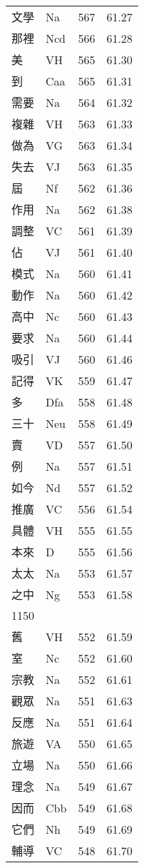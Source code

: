 \documentclass[twocolumn]{book}
\begin{document}
\begin{supertabular}{llrr}
文學 & Na & 567 &  61.27\\
那裡 & Ncd & 566 &  61.28\\
美 & VH & 565 &  61.30\\
到 & Caa & 565 &  61.31\\
需要 & Na & 564 &  61.32\\
複雜 & VH & 563 &  61.33\\
做為 & VG & 563 &  61.34\\
失去 & VJ & 563 &  61.35\\
屆 & Nf & 562 &  61.36\\
作用 & Na & 562 &  61.38\\
調整 & VC & 561 &  61.39\\
佔 & VJ & 561 &  61.40\\
模式 & Na & 560 &  61.41\\
動作 & Na & 560 &  61.42\\
高中 & Nc & 560 &  61.43\\
要求 & Na & 560 &  61.44\\
吸引 & VJ & 560 &  61.46\\
記得 & VK & 559 &  61.47\\
多 & Dfa & 558 &  61.48\\
三十 & Neu & 558 &  61.49\\
賣 & VD & 557 &  61.50\\
例 & Na & 557 &  61.51\\
如今 & Nd & 557 &  61.52\\
推廣 & VC & 556 &  61.54\\
具體 & VH & 555 &  61.55\\
本來 & D & 555 &  61.56\\
太太 & Na & 553 &  61.57\\
之中 & Ng & 553 &  61.58\\
1150\\
舊 & VH & 552 &  61.59\\
室 & Nc & 552 &  61.60\\
宗教 & Na & 552 &  61.61\\
觀眾 & Na & 551 &  61.63\\
反應 & Na & 551 &  61.64\\
旅遊 & VA & 550 &  61.65\\
立場 & Na & 550 &  61.66\\
理念 & Na & 549 &  61.67\\
因而 & Cbb & 549 &  61.68\\
它們 & Nh & 549 &  61.69\\
輔導 & VC & 548 &  61.70\\

\end{supertabular}
\end{document}
